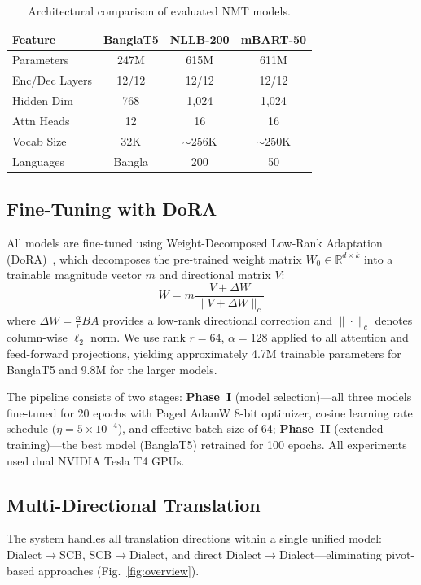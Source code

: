 \documentclass[conference]{IEEEtran}
\begin{document}
\begin{table}[t]
\centering
\caption{Architectural comparison of evaluated NMT models.}
\label{tab:model_specs}
\small
\begin{tabular}{lccc}
\toprule
\textbf{Feature} & \textbf{BanglaT5} & \textbf{NLLB-200} & \textbf{mBART-50} \\
\midrule
Parameters       & 247M    & 615M    & 611M \\
Enc/Dec Layers   & 12/12   & 12/12   & 12/12 \\
Hidden Dim       & 768     & 1,024   & 1,024 \\
Attn Heads       & 12      & 16      & 16 \\
Vocab Size       & 32K     & $\sim$256K & $\sim$250K \\
Languages        & Bangla  & 200     & 50 \\
\bottomrule
\end{tabular}
\end{table}

\subsection{Fine-Tuning with DoRA}
All models are fine-tuned using Weight-Decomposed Low-Rank Adaptation (DoRA)~\cite{liu2024dora}, which decomposes the pre-trained weight matrix $W_0 \in \mathbb{R}^{d \times k}$ into a trainable magnitude vector $m$ and directional matrix $V$:
\begin{equation}
W = m \frac{V + \Delta W}{\|V + \Delta W\|_c}
\end{equation}
where $\Delta W = \frac{\alpha}{r} BA$ provides a low-rank directional correction and $\|\cdot\|_c$ denotes column-wise $\ell_2$ norm. We use rank $r = 64$, $\alpha = 128$ applied to all attention and feed-forward projections, yielding approximately 4.7M trainable parameters for BanglaT5 and 9.8M for the larger models.

The pipeline consists of two stages: \textbf{Phase~I} (model selection)---all three models fine-tuned for 20 epochs with Paged AdamW 8-bit optimizer, cosine learning rate schedule ($\eta = 5\times10^{-4}$), and effective batch size of 64; \textbf{Phase~II} (extended training)---the best model (BanglaT5) retrained for 100 epochs. All experiments used dual NVIDIA Tesla T4 GPUs.

\subsection{Multi-Directional Translation}
The system handles all translation directions within a single unified model: Dialect$\rightarrow$SCB, SCB$\rightarrow$Dialect, and direct Dialect$\rightarrow$Dialect---eliminating pivot-based approaches (Fig.~\ref{fig:overview}).
\end{document}
